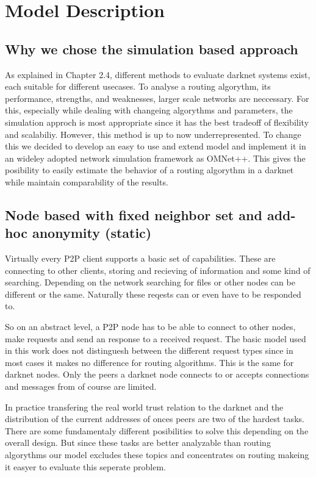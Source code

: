 \chapter{Model Description}

\section{Why we chose the simulation based approach}

As explained in Chapter 2.4, different methods to evaluate darknet systems exist, each suitable for different usecases. To analyse a routing algorythm, its performance, strengths, and weaknesses, larger scale networks are neccessary. For this, especially while dealing with changeing algorythms and parameters, the simulation approch is most appropriate since it has the best tradeoff of flexibility and scalabiliy. However, this method is up to now underrepresented. To change this we decided to develop an easy to use and extend model and implement it in an wideley adopted network simulation framework as OMNet++.  This gives the posibility to easily estimate the behavior of a routing algorythm in a darknet while maintain comparability of the results.

\section{Node based with fixed neighbor set and add-hoc anonymity (static)}

Virtually every P2P client supports a basic set of capabilities. These are connecting to other clients, storing and recieving of information and some kind of searching. Depending on the network searching for files or other nodes can be different or the same. Naturally these reqests can or even have to be responded to.

So on an abstract level, a P2P node has to be able to connect to other nodes, make requests and send an response to a received request. The basic model used in this work does not distinguesh between the different request types since in most cases it makes no difference for routing algorithms. This is the same for darknet nodes. Only the peers a darknet node connects to or accepts connections and messages from of course are limited. 

In practice transfering the real world trust relation to the darknet and the distribution of the current addresses of onces peers are two of the hardest tasks. There are some fundamentaly different posibilities to solve this depending on the overall design. But since these tasks are better analyzable than routing algorythms our model excludes these topics and concentrates on routing makeing it easyer to evaluate this seperate problem.


